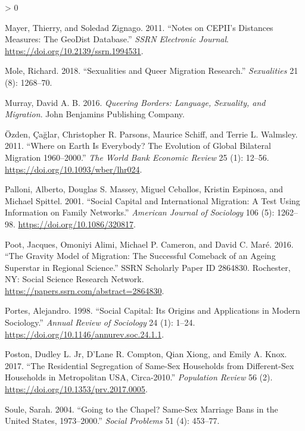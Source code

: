 \documentclass[
  11pt,
]{article}
\newlength{\cslhangindent}
\newenvironment{CSLReferences}[2] %
 {%
  \setlength{\parindent}{0pt}
  \ifodd #1 \everypar{\setlength{\hangindent}{\cslhangindent}}\ignorespaces\fi
  \ifnum #2 > 0
  \setlength{\parskip}{#2\baselineskip}
  \fi
 }%
 {}
\begin{document}
\begin{CSLReferences}{1}{0}
\leavevmode\hypertarget{ref-mayer_2011}{}%
Mayer, Thierry, and Soledad Zignago. 2011. {``Notes on {CEPII}'s {Distances} {Measures}: {The} {GeoDist} {Database}.''} \emph{SSRN Electronic Journal}. \url{https://doi.org/10.2139/ssrn.1994531}.

\leavevmode\hypertarget{ref-mole_2018a}{}%
Mole, Richard. 2018. {``Sexualities and Queer Migration Research.''} \emph{Sexualities} 21 (8): 1268--70.

\leavevmode\hypertarget{ref-murray_2016}{}%
Murray, David A. B. 2016. \emph{Queering {Borders}: {Language}, {Sexuality}, and {Migration}}. John Benjamins Publishing Company.

\leavevmode\hypertarget{ref-ozden_2011}{}%
Özden, Çağlar, Christopher R. Parsons, Maurice Schiff, and Terrie L. Walmsley. 2011. {``Where on {Earth} Is {Everybody}? {The} {Evolution} of {Global} {Bilateral} {Migration} 1960--2000.''} \emph{The World Bank Economic Review} 25 (1): 12--56. \url{https://doi.org/10.1093/wber/lhr024}.

\leavevmode\hypertarget{ref-palloni_2001}{}%
Palloni, Alberto, Douglas S. Massey, Miguel Ceballos, Kristin Espinosa, and Michael Spittel. 2001. {``Social {Capital} and {International} {Migration}: {A} {Test} {Using} {Information} on {Family} {Networks}.''} \emph{American Journal of Sociology} 106 (5): 1262--98. \url{https://doi.org/10.1086/320817}.

\leavevmode\hypertarget{ref-poot_2016}{}%
Poot, Jacques, Omoniyi Alimi, Michael P. Cameron, and David C. Maré. 2016. {``The {Gravity} {Model} of {Migration}: {The} {Successful} {Comeback} of an {Ageing} {Superstar} in {Regional} {Science}.''} SSRN Scholarly Paper ID 2864830. Rochester, NY: Social Science Research Network. \url{https://papers.ssrn.com/abstract=2864830}.

\leavevmode\hypertarget{ref-portes_1998}{}%
Portes, Alejandro. 1998. {``Social {Capital}: {Its} {Origins} and {Applications} in {Modern} {Sociology}.''} \emph{Annual Review of Sociology} 24 (1): 1--24. \url{https://doi.org/10.1146/annurev.soc.24.1.1}.

\leavevmode\hypertarget{ref-poston_2017}{}%
Poston, Dudley L. Jr, D'Lane R. Compton, Qian Xiong, and Emily A. Knox. 2017. {``The {Residential} {Segregation} of {Same}-{Sex} {Households} from {Different}-{Sex} {Households} in {Metropolitan} {USA}, Circa-2010.''} \emph{Population Review} 56 (2). \url{https://doi.org/10.1353/prv.2017.0005}.

\leavevmode\hypertarget{ref-soule_2004}{}%
Soule, Sarah. 2004. {``Going to the Chapel? {Same}-Sex Marriage Bans in the {United} {States}, 1973--2000.''} \emph{Social Problems} 51 (4): 453--77.


\end{CSLReferences}
\end{document}
